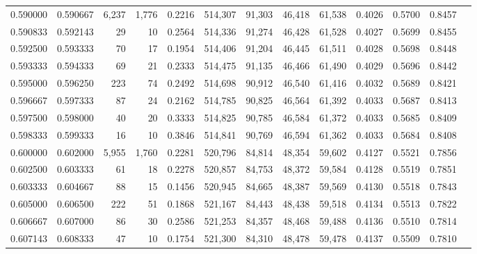 \begin{tabular}{rrrrrrrrrrrrr}
0.590000 & 0.590667 &  6,237 & 1,776 &                                     0.2216 & 514,307 &  91,303 &  46,418 &  61,538 & 0.4026 & 0.5700 & 0.8457 \\
0.590833 & 0.592143 &     29 &    10 &                                     0.2564 & 514,336 &  91,274 &  46,428 &  61,528 & 0.4027 & 0.5699 & 0.8455 \\
0.592500 & 0.593333 &     70 &    17 &                                     0.1954 & 514,406 &  91,204 &  46,445 &  61,511 & 0.4028 & 0.5698 & 0.8448 \\
0.593333 & 0.594333 &     69 &    21 &                                     0.2333 & 514,475 &  91,135 &  46,466 &  61,490 & 0.4029 & 0.5696 & 0.8442 \\
0.595000 & 0.596250 &    223 &    74 &                                     0.2492 & 514,698 &  90,912 &  46,540 &  61,416 & 0.4032 & 0.5689 & 0.8421 \\
0.596667 & 0.597333 &     87 &    24 &                                     0.2162 & 514,785 &  90,825 &  46,564 &  61,392 & 0.4033 & 0.5687 & 0.8413 \\
0.597500 & 0.598000 &     40 &    20 &                                     0.3333 & 514,825 &  90,785 &  46,584 &  61,372 & 0.4033 & 0.5685 & 0.8409 \\
0.598333 & 0.599333 &     16 &    10 &                                     0.3846 & 514,841 &  90,769 &  46,594 &  61,362 & 0.4033 & 0.5684 & 0.8408 \\
0.600000 & 0.602000 &  5,955 & 1,760 &                                     0.2281 & 520,796 &  84,814 &  48,354 &  59,602 & 0.4127 & 0.5521 & 0.7856 \\
0.602500 & 0.603333 &     61 &    18 &                                     0.2278 & 520,857 &  84,753 &  48,372 &  59,584 & 0.4128 & 0.5519 & 0.7851 \\
0.603333 & 0.604667 &     88 &    15 &                                     0.1456 & 520,945 &  84,665 &  48,387 &  59,569 & 0.4130 & 0.5518 & 0.7843 \\
0.605000 & 0.606500 &    222 &    51 &                                     0.1868 & 521,167 &  84,443 &  48,438 &  59,518 & 0.4134 & 0.5513 & 0.7822 \\
0.606667 & 0.607000 &     86 &    30 &                                     0.2586 & 521,253 &  84,357 &  48,468 &  59,488 & 0.4136 & 0.5510 & 0.7814 \\
0.607143 & 0.608333 &     47 &    10 &                                     0.1754 & 521,300 &  84,310 &  48,478 &  59,478 & 0.4137 & 0.5509 & 0.7810 \\

\end{tabular}
